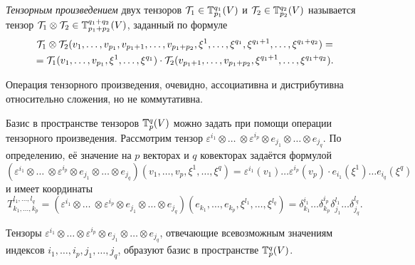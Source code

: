 \begin{definition}
    \textit{Тензорным произведением} двух тензоров $\mathcal{T}_1 \in \mathbb{T}_{p_1}^{q_1}(V)$ и $\mathcal{T}_2 \in \mathbb{T}_{p_2}^{q_2}(V)$ называется тензор $\mathcal{T}_1 \otimes \mathcal{T}_2 \in \mathbb{T}_{p_1 + p_2}^{q_1 + q_2}(V)$, заданный по формуле
    \begin{multline*}
        \mathcal{T}_1 \otimes \mathcal{T}_2(v_1, \ldots, v_{p_1}, v_{p_1 + 1}, \ldots, v_{p_1 + p_2}, \xi^1, \ldots, \xi^{q_1}, \xi^{q_1 + 1}, \ldots, \xi^{q_1 + q_2}) =\\ = \mathcal{T}_1(v_1, \ldots, v_{p_1}, \xi^1, \ldots, \xi^{q_1}) \cdot \mathcal{T}_2(v_{p_1 + 1}, \ldots, v_{p_1 + p_2}, \xi^{q_1 + 1}, \ldots, \xi^{q_1 + q_2}).
    \end{multline*}
\end{definition}

Операция тензорного произведения, очевидно, ассоциативна и дистрибутивна относительно сложения, но не коммутативна.

Базис в пространстве тензоров $\mathbb{T}_p^q(V)$ можно задать при помощи операции тензорного произведения. Рассмотрим тензор $\varepsilon^{i_1} \otimes \ldots\ \otimes \varepsilon^{i_p} \otimes e_{j_1} \otimes \ldots \otimes e_{j_q}$. По определению, её значение на $p$ векторах и $q$ ковекторах задаётся формулой
\[
    (\varepsilon^{i_1} \otimes \ldots\ \otimes \varepsilon^{i_p} \otimes e_{j_1} \otimes \ldots \otimes e_{j_q})(v_1, \ldots, v_p, \xi^1, \ldots, \xi^q) = \varepsilon^{i_1}(v_1) \ldots \varepsilon^{i_p}(v_p) \cdot e_{i_1}(\xi^1) \ldots e_{i_q}(\xi^q)
\]
и имеет координаты
\[
    T_{k_1, \ldots, k_p}^{l_1, \ldots, l_q} = (\varepsilon^{i_1} \otimes \ldots\ \otimes \varepsilon^{i_p} \otimes e_{j_1} \otimes \ldots \otimes e_{j_q})(e_{k_1}, \ldots, e_{k_p}, \xi^{l_1}, \ldots, \xi^{l_q}) = \delta_{k_1}^{i_1}\ldots\delta_{k_p}^{i_p}\delta_{j_1}^{l_1}\ldots\delta_{j_q}^{l_q}.
\]

\begin{theorem}
    Тензоры $\varepsilon^{i_1} \otimes \ldots \otimes \varepsilon^{i_p} \otimes e_{j_1} \otimes \ldots \otimes e_{j_q}$, отвечающие всевозможным значениям индексов $i_1, \ldots, i_p, j_1, \ldots, j_q$, образуют базис в пространстве $\mathbb{T}_p^q(V)$.
\end{theorem}

